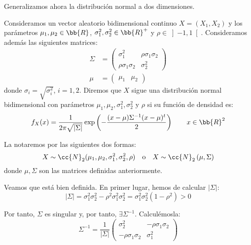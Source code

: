 Generalizamos ahora la distribución normal a dos dimensiones.
\begin{definicion}
    Consideramos un vector aleatorio bidimensional continuo $X=(X_1, X_2)$ 
    y los parámetros $\mu_1, \mu_2\in \bb{R}$, $\sigma_1^2, \sigma_2^2\in \bb{R}^+$ y $\rho\in \left]-1,1\right[$.
    Consideramos además las siguientes matrices:
    \begin{align*}
        \Sigma&=\begin{pmatrix}
            \sigma_1^2 & \rho\sigma_1\sigma_2\\
            \rho\sigma_1\sigma_2 & \sigma_2^2
        \end{pmatrix}\\
        \mu&=\begin{pmatrix}
            \mu_1 & \mu_2
        \end{pmatrix}
    \end{align*}
    donde $\sigma_i=\sqrt{\sigma_i^2}$, $i=1,2$.
    Diremos que $X$ sigue una distribución normal bidimensional con parámetros $\mu_1, \mu_2, \sigma_1^2, \sigma_2^2$ y $\rho$ si su función de densidad es:
    \begin{equation*}
        f_X(x)=\dfrac{1}{2\pi\sqrt{|\Sigma|}}\exp\left(-\dfrac{(x-\mu)\Sigma^{-1}(x-\mu)^t}{2}\right)\qquad x\in \bb{R}^2
    \end{equation*}

    La notaremos por las siguientes dos formas:
    \begin{equation*}
        X\sim \cc{N}_2(\mu_1, \mu_2, \sigma_1^2, \sigma_2^2, \rho)\quad \text{o}\quad X\sim \cc{N}_2\left(\mu, \Sigma\right)
    \end{equation*}
    donde $\mu, \Sigma$ son las matrices definidas anteriormente.
\end{definicion}

Veamos que está bien definida. En primer lugar, hemos de calcular $|\Sigma|$:
\begin{equation*}
    |\Sigma|=\sigma_1^2\sigma_2^2-\rho^2\sigma_1^2\sigma_2^2=\sigma_1^2\sigma_2^2(1-\rho^2)> 0
\end{equation*}

Por tanto, $\Sigma$ es singular y, por tanto, $\exists \Sigma^{-1}$. Calculémosla:
\begin{equation*}
    \Sigma^{-1}=\dfrac{1}{|\Sigma|}\begin{pmatrix}
        \sigma_2^2 & -\rho\sigma_1\sigma_2\\
        -\rho\sigma_1\sigma_2 & \sigma_1^2
    \end{pmatrix}
\end{equation*}

